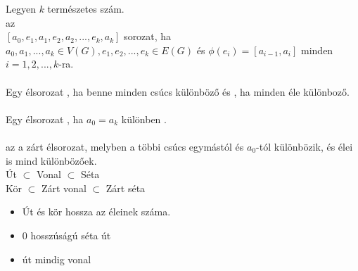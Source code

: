 \begin{frame}
\begin{tcolorbox}[title={Zárt, Nyílt élsorozat (Séta)}]
Legyen $k$ természetes szám.\\
 az\\
\msmallskip
$[a_0, e_1, a_1, e_2, a_2, ..., e_k, a_k]$ sorozat, ha $a_0, a_1, ..., a_k \in V(G), e_1, e_2, ..., e_k \in E(G)$ és ${\phi}(e_i) = [a_{i - 1}, a_i]$ minden $i = 1, 2, ..., k$-ra.\\
\mbigskip
{}\\
Egy élsorozat , ha benne minden csúcs különböző és , ha minden éle különboző.\\
\mbigskip
{}\\
Egy élsorozat , ha $a_0 = a_k$ különben .\\
\mbigskip
{}\\
 az a zárt élsorozat, melyben a többi csúcs egymástól és $a_0$-tól különbözik, és élei is mind különbözőek.\\
\mbigskip
Út $\subset$ Vonal $\subset$ Séta\\
\mmedskip
Kör $\subset$ Zárt vonal $\subset$ Zárt séta
\end{tcolorbox}
\begin{tcolorbox}[title={Ész}]
\begin{itemize}
\item Út és kör hossza az éleinek száma.
\item 0 hosszúságú séta út
\item út mindig vonal
\end{itemize}
\end{tcolorbox}

\end{frame}


